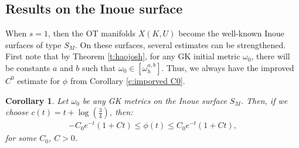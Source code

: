 \documentclass[12pt]{amsart}
\numberwithin{equation}{section}
\newtheorem{cor}[prop]{Corollary}
\numberwithin{prop}{section}
\theoremstyle{definition}
\begin{document}
%
%
\subsection{Results on the Inoue surface}
%
%

When $s = 1$, then the OT manifolds $X(K,U)$ become the well-known Inoue surfaces of type $S_M$. On these surfaces, several estimates can be strengthened.  First note that by Theorem \ref{t:haojosh}, for any GK initial metric $\omega_0$, there will be constants $a$ and $b$ such that $\omega_0\in[\omega^{a,b}_h]$.
Thus, we always have the improved $C^0$ estimate for $\phi$ from Corollary \ref{c:imporved C0}.
\begin{cor}\label{c:Inoue C0}
    Let $\omega_0$ be any GK metrics on the Inoue surface $S_M$. Then, if we choose $c(t) = t + \log(\frac{3}{4})$, then:
    \begin{align*}
        -C_0e^{-t}(1+Ct)\leq\phi(t)\leq C_0 e^{-t}(1+Ct),
    \end{align*}
    for some $C_0$, $C>0$.
\end{cor}
\end{document}
